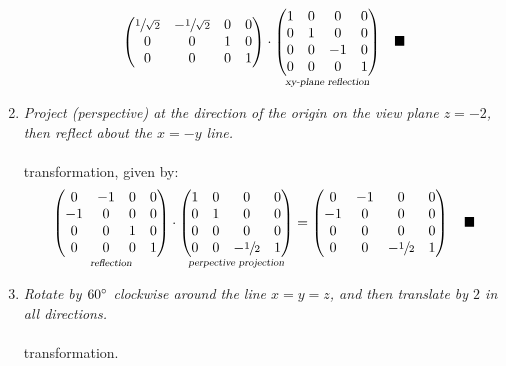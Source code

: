 \documentclass{article}
\newcommand{\proofend}{\quad\blacksquare}
\begin{document}
\begin{enumerate}
$${\begin{pmatrix}
                \sfrac{1}{\sqrt{2}}&-\sfrac{1}{\sqrt{2}}&0&0\\
                0&0&1&0\\
                0&0&0&1
            \end{pmatrix}}
            \cdot
            \underset{\textsl{xy-plane reflection}}{\begin{pmatrix}1&0&0&0\\0&1&0&0\\0&0&-1&0\\0&0&0&1\end{pmatrix}}\proofend
        $$
        \newpage
        \item \textsl{Project (perspective) at the direction of the origin on the view plane $z=-2$, then reflect about the $x=-y$ line.}\\\\
         transformation, given by:
        $$
            \underset{\textsl{reflection}}{
                \begin{pmatrix}
                    0&-1&0&0\\
                    -1&0&0&0\\
                    0&0&1&0\\
                    0&0&0&1
                \end{pmatrix}
            }
            \cdot
            \underset{\textsl{perpective projection}}{
                \begin{pmatrix}
                    1&0&0&0\\
                    0&1&0&0\\
                    0&0&0&0\\
                    0&0&-\sfrac{1}{2}&1
                \end{pmatrix}
            }
            =
            \begin{pmatrix}
                0&-1&0&0\\
                -1&0&0&0\\
                0&0&0&0\\
                0&0&-\sfrac{1}{2}&1
            \end{pmatrix}\proofend
        $$
    \item \textsl{Rotate by $60\degree$ clockwise around the line $x=y=z$, and then translate by $2$ in all directions.}\\\\
     transformation.\\\\

\end{enumerate}
\end{document}

